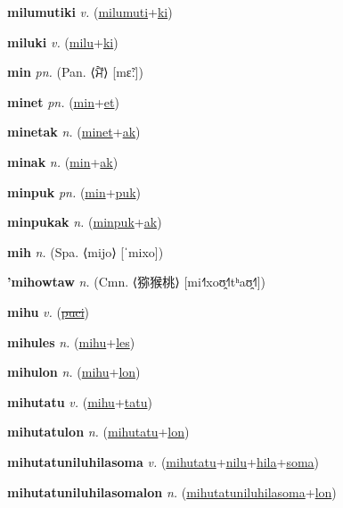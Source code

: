 \textbf{\hypertarget{milumutiki}{milumutiki}} \textit{v.} (\hyperlink{milumuti}{milumuti}+\allowbreak \hyperlink{ki}{ki})


\textbf{\hypertarget{miluki}{miluki}} \textit{v.} (\hyperlink{milu}{milu}+\allowbreak \hyperlink{ki}{ki})


\textbf{\hypertarget{min}{min}} \textit{pn.} (Pan. ⟨{\gurmukhi{}ਮੈਂ}⟩ [mɛ̃ː])


\textbf{\hypertarget{minet}{minet}} \textit{pn.} (\hyperlink{min}{min}+\allowbreak \hyperlink{et}{et})


\textbf{\hypertarget{minetak}{minetak}} \textit{n.} (\hyperlink{minet}{minet}+\allowbreak \hyperlink{ak}{ak})


\textbf{\hypertarget{minak}{minak}} \textit{n.} (\hyperlink{min}{min}+\allowbreak \hyperlink{ak}{ak})


\textbf{\hypertarget{minpuk}{minpuk}} \textit{pn.} (\hyperlink{min}{min}+\allowbreak \hyperlink{puk}{puk})


\textbf{\hypertarget{minpukak}{minpukak}} \textit{n.} (\hyperlink{minpuk}{minpuk}+\allowbreak \hyperlink{ak}{ak})


\textbf{\hypertarget{mih}{mih}} \textit{n.} (Spa. ⟨mijo⟩ [ˈmixo])


\textbf{\hypertarget{'mihowtaw}{'mihowtaw}} \textit{n.} (Cmn. ⟨{\chinese{}猕猴桃}⟩ [mi˧˥xoʊ̯˧˥tʰaʊ̯˧˥])


\textbf{\hypertarget{mihu}{mihu}} \textit{v.} (\hyperlink{puci}{\sout{puci}})


\textbf{\hypertarget{mihules}{mihules}} \textit{n.} (\hyperlink{mihu}{mihu}+\allowbreak \hyperlink{les}{les})


\textbf{\hypertarget{mihulon}{mihulon}} \textit{n.} (\hyperlink{mihu}{mihu}+\allowbreak \hyperlink{lon}{lon})


\textbf{\hypertarget{mihutatu}{mihutatu}} \textit{v.} (\hyperlink{mihu}{mihu}+\allowbreak \hyperlink{tatu}{tatu})


\textbf{\hypertarget{mihutatulon}{mihutatulon}} \textit{n.} (\hyperlink{mihutatu}{mihutatu}+\allowbreak \hyperlink{lon}{lon})


\textbf{\hypertarget{mihutatuniluhilasoma}{mihutatuniluhilasoma}} \textit{v.} (\hyperlink{mihutatu}{mihutatu}+\allowbreak \hyperlink{nilu}{nilu}+\allowbreak \hyperlink{hila}{hila}+\allowbreak \hyperlink{soma}{soma})


\textbf{\hypertarget{mihutatuniluhilasomalon}{mihutatuniluhilasomalon}} \textit{n.} (\hyperlink{mihutatuniluhilasoma}{mihutatuniluhilasoma}+\allowbreak \hyperlink{lon}{lon})


